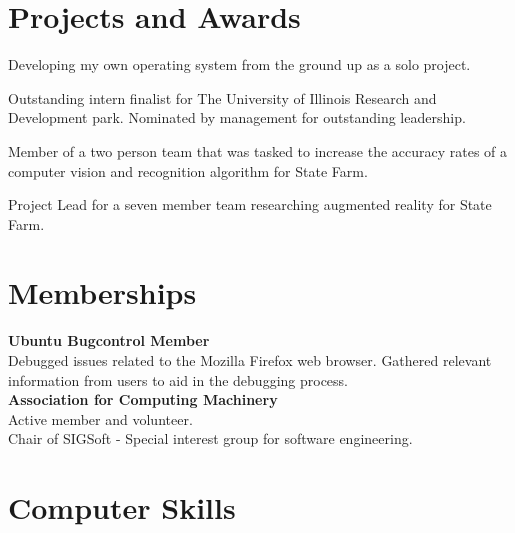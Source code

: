 \documentclass[10pt]{article}
\begin{document}
{{\begin{minipage}[t]{0.44\textwidth}
\section{Projects and Awards}

    \par\raggedright
    Developing my own operating system from the ground up as a solo project. \\[5pt]

    \par\raggedright
    Outstanding intern finalist for The University of Illinois Research and Development park.
    Nominated by management for outstanding leadership.\\[5pt]


    \par\raggedright
    Member of a two person team that was tasked to increase the accuracy rates of a computer vision
    and recognition algorithm for State Farm. \\[5pt]

    \par\raggedright
    Project Lead for a seven member team researching augmented reality for State Farm.\\[10pt]



\section{Memberships}
\textbf{Ubuntu Bugcontrol Member} \\[5pt]
Debugged issues related to the Mozilla Firefox web browser.
Gathered relevant information from users to aid in the debugging process.
\\[10pt]


\textbf{Association for Computing Machinery} \\[5pt]
Active member and volunteer.\\
Chair of SIGSoft - Special interest group for software engineering.
\\[15pt]




\section{Computer Skills}


\end{minipage}}}
\end{document}
